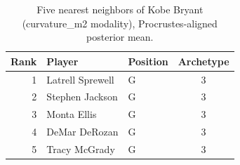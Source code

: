 \begin{table}[htbp]
  \centering\small
  \begin{tabular}{rllc}
    \toprule
    Rank & Player & Position & Archetype \\
    \midrule
    1 & Latrell Sprewell & G & 3 \\
    2 & Stephen Jackson & G & 3 \\
    3 & Monta Ellis & G & 3 \\
    4 & DeMar DeRozan & G & 3 \\
    5 & Tracy McGrady & G & 3 \\
    \bottomrule
  \end{tabular}
  \caption{Five nearest neighbors of Kobe Bryant (curvature_m2 modality), Procrustes-aligned posterior mean.}
  \label{tab:Kobe_Bryant_neighbors_curvature_m2}
\end{table}

